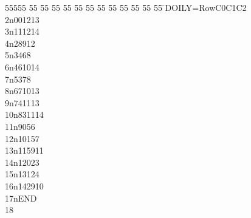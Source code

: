 %
%
\begin{tabbing}
55555 \= 55 \= 55 \= 55 \= 55 \= 55 \= 55 \= 55 \= 55 \= 55 \= 55 \= 55 \= 55 \= \>DOILY=RowC0C1C2\\[0pt]
2\>n001213\\[0pt]
3\>n111214\\[0pt]
4\>n28912\\[0pt]
5\>n3468\\[0pt]
6\>n461014\\[0pt]
7\>n5378\\[0pt]
8\>n671013\\[0pt]
9\>n741113\\[0pt]
10\>n831114\\[0pt]
11\>n9056\\[0pt]
12\>n10157\\[0pt]
13\>n115911\\[0pt]
14\>n12023\\[0pt]
15\>n13124\\[0pt]
16\>n142910\\[0pt]
17\>nEND\\[0pt]
18\>\end{tabbing}
